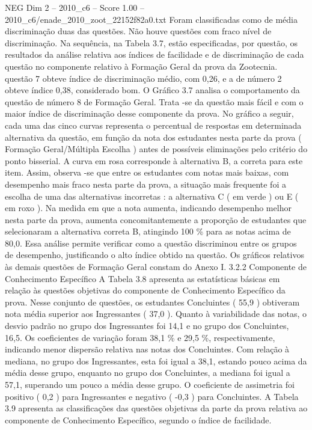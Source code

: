 \begin{textsample}{NEG Dim 2 – 2010\_c6 – Score 1.00 – 2010\_c6/enade\_2010\_zoot\_22152f82a0.txt}
Foram classificadas como de média discriminação duas das questões.
Não houve questões com fraco nível de discriminação.
Na sequência, na Tabela 3.7, estão especificadas, por questão, os resultados da análise relativa aos índices de facilidade e de discriminação de cada questão no componente relativo à Formação Geral da prova da Zootecnia. questão 7 obteve índice de discriminação médio, com 0,26, e a de número 2 obteve índice 0,38, considerado bom.
O Gráfico 3.7 analisa o comportamento da questão de número 8 de Formação Geral.
Trata -se da questão mais fácil e com o maior índice de discriminação desse componente da prova.
No gráfico a seguir, cada uma das cinco curvas representa o percentual de respostas em determinada alternativa da questão, em função da nota dos estudantes nesta parte da prova ( Formação Geral/Múltipla Escolha ) antes de possíveis eliminações pelo critério do ponto bisserial.
A curva em rosa corresponde à alternativa B, a correta para este item.
Assim, observa -se que entre os estudantes com notas mais baixas, com desempenho mais fraco nesta parte da prova, a situação mais frequente foi a escolha de uma das alternativas incorretas : a alternativa C ( em verde ) ou E ( em roxo ).
Na medida em que a nota aumenta, indicando desempenho melhor nesta parte da prova, aumenta concomitantemente a proporção de estudantes que selecionaram a alternativa correta B, atingindo 100 \% para as notas acima de 80,0.
Essa análise permite verificar como a questão discriminou entre os grupos de desempenho, justificando o alto índice obtido na questão.
Os gráficos relativos às demais questões de Formação Geral constam do Anexo I. 3.2.2 Componente de Conhecimento Específico A Tabela 3.8 apresenta as estatísticas básicas em relação às questões objetivas do componente de Conhecimento Específico da prova.
Nesse conjunto de questões, os estudantes Concluintes ( 55,9 ) obtiveram nota média superior aos Ingressantes ( 37,0 ).
Quanto à variabilidade das notas, o desvio padrão no grupo dos Ingressantes foi 14,1 e no grupo dos Concluintes, 16,5.
Os coeficientes de variação foram 38,1 \% e 29,5 \%, respectivamente, indicando menor dispersão relativa nas notas dos Concluintes.
Com relação à mediana, no grupo dos Ingressantes, esta foi igual a 38,1, estando pouco acima da média desse grupo, enquanto no grupo dos Concluintes, a mediana foi igual a 57,1, superando um pouco a média desse grupo.
O coeficiente de assimetria foi positivo ( 0,2 ) para Ingressantes e negativo ( -0,3 ) para Concluintes.
A Tabela 3.9 apresenta as classificações das questões objetivas da parte da prova relativa ao componente de Conhecimento Específico, segundo o índice de facilidade.

\end{textsample}
